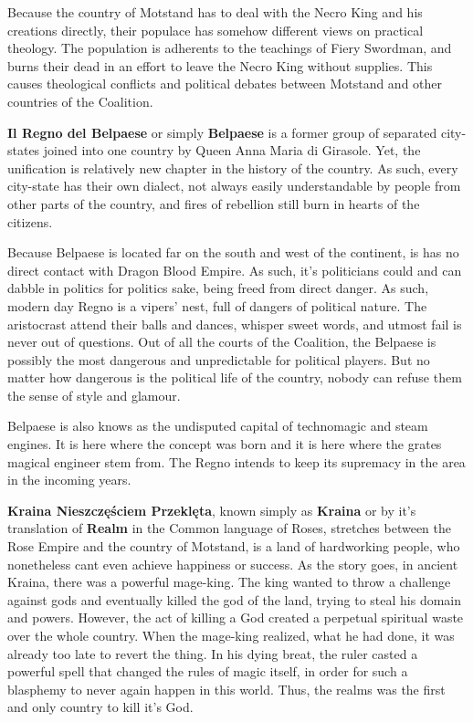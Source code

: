 \documentclass[a4paper,11pt]{article}
\begin{document}
Because the country of Motstand has to deal with the Necro King and his creations directly, their populace has somehow different views on practical theology. The population is adherents to the teachings of Fiery Swordman, and burns their dead in an effort to leave the Necro King without supplies. This causes theological conflicts and political debates between Motstand and other countries of the Coalition. 

\textbf{Il Regno del Belpaese} or simply \textbf{Belpaese} is a former group of separated city-states joined into one country by Queen Anna Maria di Girasole. Yet, the unification is relatively new chapter in the history of the country. As such, every city-state has their own dialect, not always easily understandable by people from other parts of the country, and fires of rebellion still burn in hearts of the citizens. 

Because Belpaese is located far on the south and west of the continent, is has no direct contact with Dragon Blood Empire. As such, it's politicians could and can dabble in politics for politics sake, being freed from direct danger. As such, modern day Regno is a vipers' nest, full of dangers of political nature. The aristocrast attend their balls and dances, whisper sweet words, and utmost fail is never out of questions. Out of all the courts of the Coalition, the Belpaese is possibly the most dangerous and unpredictable for political players. But no matter how dangerous is the political life of the country, nobody can refuse them the sense of style and glamour.

Belpaese is also knows as the undisputed capital of technomagic and steam engines. It is here where the concept was born and it is here where the grates magical engineer stem from. The Regno intends to keep its supremacy in the area in the incoming years. 

\textbf{Kraina Nieszczęściem Przeklęta}, known simply as \textbf{Kraina} or by it's translation of \textbf{Realm} in the Common language of Roses, stretches between the Rose Empire and the country of Motstand, is a land of hardworking people, who nonetheless cant even achieve happiness or success. As the story goes, in ancient Kraina, there was a powerful mage-king. The king wanted to throw a challenge against gods and eventually killed the god of the land, trying to steal his domain and powers. However, the act of killing a God created a perpetual spiritual waste over the whole country. When the mage-king realized, what he had done, it was already too late to revert the thing. In his dying breat, the ruler casted a powerful spell that changed the rules of magic itself, in order for such a blasphemy to never again happen in this world. Thus, the realms was the first and only country to kill it's God.
\end{document}
